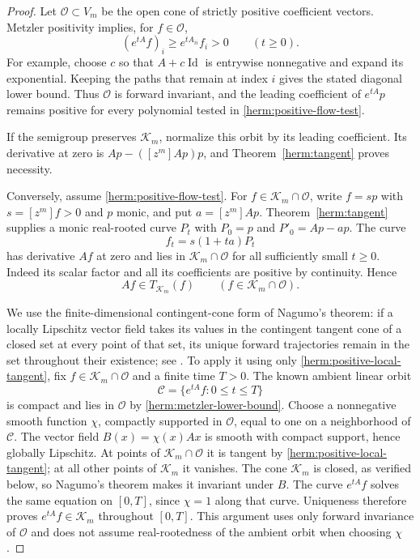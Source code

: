 \documentclass[reqno]{amsart}
\theoremstyle{definition}
\theoremstyle{remark}
\DeclareMathOperator{\Id}{Id}
\begin{document}
\begin{proof}
Let $\mathcal O\subset V_m$ be the open cone of strictly positive
coefficient vectors.  Metzler positivity implies, for $f\in\mathcal O$,
\begin{equation}
 (e^{tA}f)_i\geq e^{tA_{ii}}f_i>0\qquad(t\geq0).
 \label{herm:metzler-lower-bound}
\end{equation}
For example, choose $c$ so that $A+c\Id$ is entrywise nonnegative and
expand its exponential.  Keeping the paths that remain at index $i$
gives the stated diagonal lower bound.  Thus $\mathcal O$ is forward
invariant, and the leading coefficient of $e^{tA}p$ remains positive
for every polynomial tested in \eqref{herm:positive-flow-test}.

If the semigroup preserves $\mathcal K_m$, normalize this orbit by its
leading coefficient.  Its derivative at zero is
$Ap-([z^m]Ap)p$, and Theorem~\ref{herm:tangent} proves necessity.

Conversely, assume \eqref{herm:positive-flow-test}.  For
$f\in\mathcal K_m\cap\mathcal O$, write $f=sp$ with
$s=[z^m]f>0$ and $p$ monic, and put $a=[z^m]Ap$.
Theorem~\ref{herm:tangent} supplies a monic real-rooted curve $P_t$
with $P_0=p$ and $P'_0=Ap-ap$.  The curve
\[
 f_t=s(1+ta)P_t
\]
has derivative $Af$ at zero and lies in $\mathcal K_m\cap\mathcal O$
for all sufficiently small $t\geq0$.  Indeed its scalar factor and
all its coefficients are positive by continuity.  Hence
\begin{equation}
 Af\in T_{\mathcal K_m}(f)
       \qquad(f\in\mathcal K_m\cap\mathcal O).
 \label{herm:positive-local-tangent}
\end{equation}

We use the finite-dimensional contingent-cone form of Nagumo's theorem:
if a locally Lipschitz vector field takes its values in the contingent
tangent cone of a closed set at every point of that set, its unique
forward trajectories remain in the set throughout their existence;
see \cite{Nagumo42,GhorbalSogokonPlatzer17}.  To apply it using only
\eqref{herm:positive-local-tangent}, fix
$f\in\mathcal K_m\cap\mathcal O$ and a finite time $T>0$.
The known ambient linear orbit
\[
 \mathcal C=\{e^{tA}f:0\leq t\leq T\}
\]
is compact and lies in $\mathcal O$ by
\eqref{herm:metzler-lower-bound}.  Choose a nonnegative smooth function
$\chi$, compactly supported in $\mathcal O$, equal to one on a
neighborhood of $\mathcal C$.  The vector field
$B(x)=\chi(x)Ax$ is smooth with compact support, hence globally
Lipschitz.  At points of $\mathcal K_m\cap\mathcal O$ it is tangent
by \eqref{herm:positive-local-tangent}; at all other points of
$\mathcal K_m$ it vanishes.  The cone $\mathcal K_m$ is closed, as
verified below, so Nagumo's theorem makes it invariant under $B$.
The curve $e^{tA}f$ solves the same equation on $[0,T]$, since
$\chi=1$ along that curve.  Uniqueness therefore proves
$e^{tA}f\in\mathcal K_m$ throughout $[0,T]$.  This argument uses only
forward invariance of $\mathcal O$ and does not assume real-rootedness
of the ambient orbit when choosing $\chi$.


\end{proof}
\end{document}
